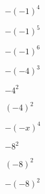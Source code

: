 \begin{BloqueEjercicios}
  \begin{ej3col}
    \item $-(-1)^4$
    \item $-(-1)^5$
    \item $-(-1)^6$
    \item $-(-4)^3$
    \item $-4^2$
    \item $(-4)^2$
    \item $-(-x)^4$
    \item $-8^2$
    \item $(-8)^2$
    \item $-(-8)^2$
  \end{ej3col}
\end{BloqueEjercicios}
